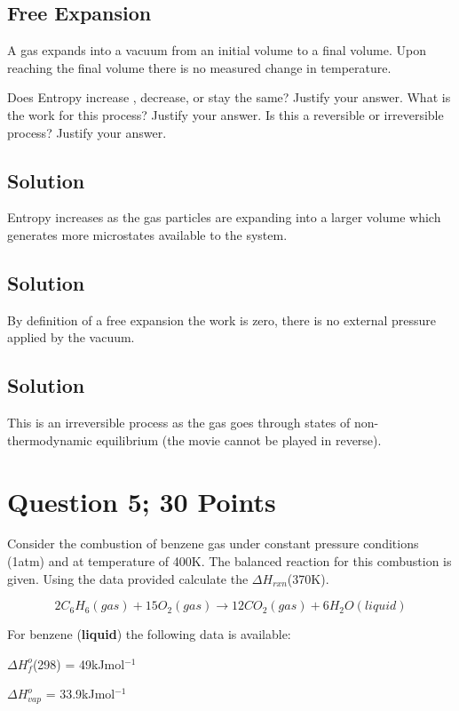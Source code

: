 \documentclass{article}
\newcommand{\be}{\begin{equation}}
\newcommand{\ee}{\end{equation}}
\begin{document}
\subsection*{Free Expansion}
A gas expands into a vacuum from an initial volume to a final volume. 
Upon reaching the final volume there is no measured change in temperature. 
\bigskip

Does Entropy increase , decrease, or stay the same? Justify your answer.
What is the work for this process? Justify your answer. 
Is this a reversible or irreversible process? Justify your answer.

\subsection*{Solution}
Entropy increases as the gas particles are expanding into a larger volume which generates more microstates available to the system.

\subsection*{Solution}
By definition of a free expansion the work is zero, there is no external pressure applied by the vacuum. 

\subsection*{Solution}
This is an irreversible process as the gas goes through states of non-thermodynamic equilibrium (the movie cannot be played in reverse). 

\newpage

\section*{Question 5; 30 Points}

Consider the combustion of benzene gas under constant pressure conditions (1atm) and at temperature of 400K. The balanced reaction for this combustion is given. Using the data provided calculate the $\Delta H_{rxn}$(370K). 

\be
2C_6H_6(gas) + 15O_2(gas) \longrightarrow 12CO_2(gas) + 6H_2O (liquid)
\ee

For benzene (\textbf{liquid}) the following data is available:
\bigskip

$\Delta H^o_{f}$(298) = 49kJmol$^{-1}$
\bigskip

$\Delta H^o_{vap}$ = 33.9kJmol$^{-1}$
\bigskip
\end{document}
